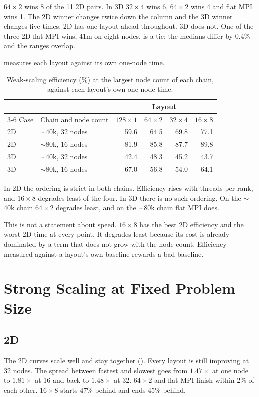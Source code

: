 \documentclass[12pt,a4paper,notitlepage]{report}
\let\OldSubsection\subsection
\renewcommand{\subsection}{\FloatBarrier\OldSubsection}
\begin{document}
$64\times2$ wins 8 of the 11 2D pairs. In 3D $32\times4$ wins 6, $64\times2$ wins 4 and
flat MPI wins 1. The 2D winner changes twice down the column and the 3D winner changes
five times. 2D has one layout ahead throughout. 3D does not. One of the three 2D flat-MPI wins,
41m on eight nodes, is a tie: the medians differ by 0.4\% and the ranges overlap.

 measures each layout against its own one-node time.

\begin{table}[htbp]
  \centering
  \caption{Weak-scaling efficiency (\%) at the largest node count of each chain, against each
  layout's own one-node time.}
  \label{tab:weak-eff}
  \begin{tabular}{llrrrr}
    \toprule
    & & \multicolumn{4}{c}{Layout} \\
    \cmidrule(lr){3-6}
    Case & Chain and node count & $128\times1$ & $64\times2$ & $32\times4$ & $16\times8$ \\
    \midrule
    2D & $\sim$40k, 32 nodes & 59.6 & 64.5 & 69.8 & 77.1 \\
    2D & $\sim$80k, 16 nodes & 81.9 & 85.8 & 87.7 & 89.8 \\
    3D & $\sim$40k, 32 nodes & 42.4 & 48.3 & 45.2 & 43.7 \\
    3D & $\sim$80k, 16 nodes & 67.0 & 56.8 & 54.0 & 64.1 \\
    \bottomrule
  \end{tabular}
\end{table}

In 2D the ordering is strict in both chains. Efficiency rises with threads per rank, and
$16\times8$ degrades least of the four. In 3D there is no such ordering. On the $\sim$40k
chain $64\times2$ degrades least, and on the $\sim$80k chain flat MPI does.

This is not a statement about speed. $16\times8$ has the best 2D efficiency and the worst
2D time at every point. It degrades least because its cost is already dominated by a term
that does not grow with the node count. Efficiency measured against a layout's own
baseline rewards a bad baseline.

\section{Strong Scaling at Fixed Problem Size}
\label{sec:strong}

\subsection{2D}
\label{sec:strong-2d}
The 2D curves scale well and stay together (). Every layout is
still improving at 32 nodes. The spread between fastest and slowest goes from
$1.47\times$ at one node to $1.81\times$ at 16 and back to $1.48\times$ at 32.
$64\times2$ and flat MPI finish within 2\% of each other. $16\times8$ starts 47\% behind
and ends 45\% behind.
\end{document}

